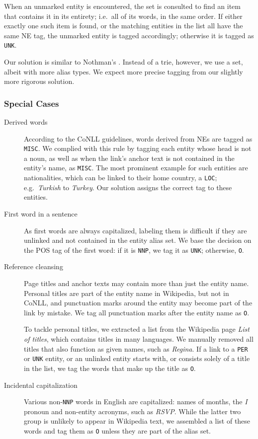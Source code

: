 \documentclass[11pt]{article}
\begin{document}
When an unmarked entity is encountered, the set is consulted to find an item that contains it in its entirety; i.e.~all of its words, in the same order. If either exactly one such item is found, or the matching entities in the list all have the same NE tag, the unmarked entity is tagged accordingly; otherwise it is tagged as \texttt{UNK}.

Our solution is similar to Nothman's . Instead of a trie, however, we use a set, albeit with more alias types. We expect more precise tagging from our slightly more rigorous solution.

\subsubsection{Special Cases}


\begin{description}
\item[Derived words] According to the CoNLL guidelines, words derived from NEs are tagged as \texttt{MISC}. We complied with this rule by tagging each entity whose head is not a noun, as well as when the link's anchor text is not contained in the entity's name, as \texttt{MISC}. The most prominent example for such entities are nationalities, which can be linked to their home country, a \texttt{LOC}; e.g.~\textit{Turkish} to \textit{Turkey}. Our solution assigns the correct tag to these entities.
\item[First word in a sentence] As first words are always capitalized, labeling them is difficult if they are unlinked and not contained in the entity alias set. We base the decision on the POS tag of the first word: if it is \texttt{NNP}, we tag it as \texttt{UNK}; otherwise, \texttt{O}.
\item[Reference cleansing] Page titles and anchor texts may contain more than just the entity name. Personal titles are part of the entity name in Wikipedia, but not in CoNLL, and punctuation marks around the entity may become part of the link by mistake. We tag all punctuation marks after the entity name as \texttt{O}.

To tackle personal titles, we extracted a list from the Wikipedia page \textit{List of titles}, which contains titles in many languages. We manually removed all titles that also function as given names, such as \textit{Regina}. If a link to a \texttt{PER} or \texttt{UNK} entity, or an unlinked entity starts with, or consists solely of a title in the list, we tag the words that make up the title as \texttt{O}.
\item[Incidental capitalization] Various non-\texttt{NNP} words in English are capitalized: names of months, the \textit{I} pronoun and non-entity acronyms, such as \textit{RSVP}. While the latter two group is unlikely to appear in Wikipedia text, we assembled a list of these words and tag them as \texttt{O} unless they are part of the alias set.
\end{description}
\end{document}
